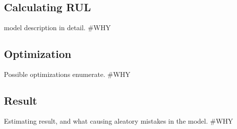 	\subsection{Calculating RUL}
model description in detail.
\#WHY
	\subsection{Optimization}
Possible optimizations enumerate.
\#WHY
	\subsection{Result}
Estimating result, and what causing aleatory mistakes in the model. 
\#WHY
\cite{GitHub_FP_RUL}